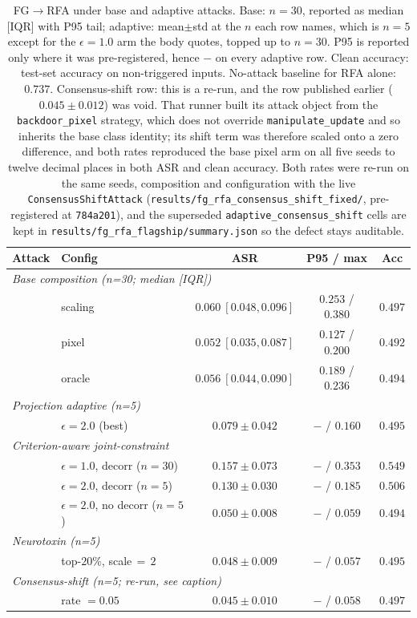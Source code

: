 \documentclass{article}
\begin{document}
\begin{table}[h]
\caption{FG$\to$RFA under base and adaptive attacks. Base: $n{=}30$, reported as median [IQR] with P95 tail; adaptive: mean$\pm$std at the $n$ each row names, which is $n{=}5$ except for the $\epsilon{=}1.0$ arm the body quotes, topped up to $n{=}30$. P95 is reported only where it was pre-registered, hence $-$ on every adaptive row. Clean accuracy: test-set accuracy on non-triggered inputs. No-attack baseline for RFA alone: $0.737$. Consensus-shift row: this is a re-run, and the row published earlier ($0.045 \pm 0.012$) was void. That runner built its attack object from the \texttt{backdoor\_pixel} strategy, which does not override \texttt{manipulate\_update} and so inherits the base class identity; its shift term was therefore scaled onto a zero difference, and both rates reproduced the base pixel arm on all five seeds to twelve decimal places in both ASR and clean accuracy. Both rates were re-run on the same seeds, composition and configuration with the live \texttt{ConsensusShiftAttack} (\texttt{results/\allowbreak fg\_rfa\_consensus\_shift\_fixed/}, pre-registered at \texttt{784a201}), and the superseded \texttt{adaptive\_consensus\_shift} cells are kept in \texttt{results/\allowbreak fg\_rfa\_flagship/\allowbreak summary.json} so the defect stays auditable.}
\label{tab:fg_rfa_flagship}
\centering
\small
\begin{tabular}{llccc}
\toprule
\textbf{Attack} & \textbf{Config} & \textbf{ASR} & \textbf{P95 / max} & \textbf{Acc} \\
\midrule
\multicolumn{5}{l}{\emph{Base composition (n=30; median [IQR])}} \\
& scaling & $0.060\ [0.048, 0.096]$ & $0.253$ / $0.380$ & $0.497$ \\
& pixel & $0.052\ [0.035, 0.087]$ & $0.127$ / $0.200$ & $0.492$ \\
& oracle & $0.056\ [0.044, 0.090]$ & $0.189$ / $0.236$ & $0.494$ \\
\midrule
\multicolumn{5}{l}{\emph{Projection adaptive (n=5)}} \\
& $\epsilon{=}2.0$ (best) & $0.079 \pm 0.042$ & $-$ / $0.160$ & $0.495$ \\
\midrule
\multicolumn{5}{l}{\emph{Criterion-aware joint-constraint}} \\
& $\epsilon{=}1.0$, decorr ($n{=}30$) & $0.157 \pm 0.073$ & $-$ / $0.353$ & $0.549$ \\
& $\epsilon{=}2.0$, decorr ($n{=}5$) & $0.130 \pm 0.030$ & $-$ / $0.185$ & $0.506$ \\
& $\epsilon{=}2.0$, no decorr ($n{=}5$) & $0.050 \pm 0.008$ & $-$ / $0.059$ & $0.494$ \\
\midrule
\multicolumn{5}{l}{\emph{Neurotoxin (n=5)}} \\
& top-$20\%$, scale$\,{=}\,2$ & $0.048 \pm 0.009$ & $-$ / $0.057$ & $0.495$ \\
\midrule
\multicolumn{5}{l}{\emph{Consensus-shift (n=5; re-run, see caption)}} \\
& rate $= 0.05$ & $0.045 \pm 0.010$ & $-$ / $0.058$ & $0.497$ \\
\bottomrule
\end{tabular}
\end{table}
\end{document}
